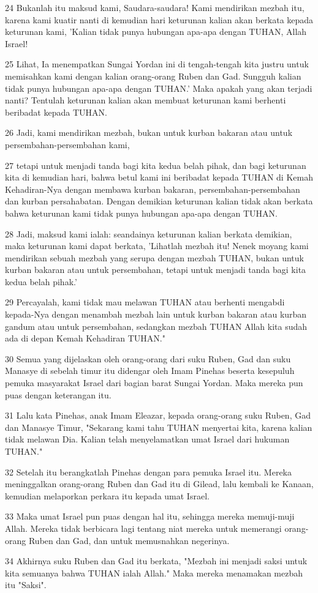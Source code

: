 \par 24 Bukanlah itu maksud kami, Saudara-saudara! Kami mendirikan mezbah itu, karena kami kuatir nanti di kemudian hari keturunan kalian akan berkata kepada keturunan kami, 'Kalian tidak punya hubungan apa-apa dengan TUHAN, Allah Israel!
\par 25 Lihat, Ia menempatkan Sungai Yordan ini di tengah-tengah kita justru untuk memisahkan kami dengan kalian orang-orang Ruben dan Gad. Sungguh kalian tidak punya hubungan apa-apa dengan TUHAN.' Maka apakah yang akan terjadi nanti? Tentulah keturunan kalian akan membuat keturunan kami berhenti beribadat kepada TUHAN.
\par 26 Jadi, kami mendirikan mezbah, bukan untuk kurban bakaran atau untuk persembahan-persembahan kami,
\par 27 tetapi untuk menjadi tanda bagi kita kedua belah pihak, dan bagi keturunan kita di kemudian hari, bahwa betul kami ini beribadat kepada TUHAN di Kemah Kehadiran-Nya dengan membawa kurban bakaran, persembahan-persembahan dan kurban persahabatan. Dengan demikian keturunan kalian tidak akan berkata bahwa keturunan kami tidak punya hubungan apa-apa dengan TUHAN.
\par 28 Jadi, maksud kami ialah: seandainya keturunan kalian berkata demikian, maka keturunan kami dapat berkata, 'Lihatlah mezbah itu! Nenek moyang kami mendirikan sebuah mezbah yang serupa dengan mezbah TUHAN, bukan untuk kurban bakaran atau untuk persembahan, tetapi untuk menjadi tanda bagi kita kedua belah pihak.'
\par 29 Percayalah, kami tidak mau melawan TUHAN atau berhenti mengabdi kepada-Nya dengan menambah mezbah lain untuk kurban bakaran atau kurban gandum atau untuk persembahan, sedangkan mezbah TUHAN Allah kita sudah ada di depan Kemah Kehadiran TUHAN."
\par 30 Semua yang dijelaskan oleh orang-orang dari suku Ruben, Gad dan suku Manasye di sebelah timur itu didengar oleh Imam Pinehas beserta kesepuluh pemuka masyarakat Israel dari bagian barat Sungai Yordan. Maka mereka pun puas dengan keterangan itu.
\par 31 Lalu kata Pinehas, anak Imam Eleazar, kepada orang-orang suku Ruben, Gad dan Manasye Timur, "Sekarang kami tahu TUHAN menyertai kita, karena kalian tidak melawan Dia. Kalian telah menyelamatkan umat Israel dari hukuman TUHAN."
\par 32 Setelah itu berangkatlah Pinehas dengan para pemuka Israel itu. Mereka meninggalkan orang-orang Ruben dan Gad itu di Gilead, lalu kembali ke Kanaan, kemudian melaporkan perkara itu kepada umat Israel.
\par 33 Maka umat Israel pun puas dengan hal itu, sehingga mereka memuji-muji Allah. Mereka tidak berbicara lagi tentang niat mereka untuk memerangi orang-orang Ruben dan Gad, dan untuk memusnahkan negerinya.
\par 34 Akhirnya suku Ruben dan Gad itu berkata, "Mezbah ini menjadi saksi untuk kita semuanya bahwa TUHAN ialah Allah." Maka mereka menamakan mezbah itu "Saksi".

